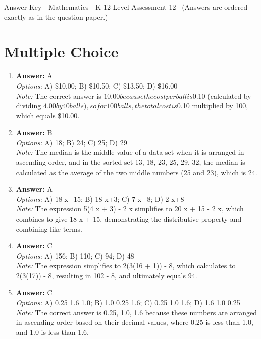 \documentclass[12pt]{article}
\begin{document}
\begin{center}
Answer Key - Mathematics - K-12 Level Assessment 12 \
\small (Answers are ordered exactly as in the question paper.)
\end{center}

\section*{Multiple Choice}
\begin{enumerate}[label=\arabic*.]
\item \textbf{Answer:} A
\\ \textit{Options:} A) \$10.00; B) \$10.50; C) \$13.50; D) \$16.00
\\ \textit{Note:} The correct answer is $10.00 because the cost per ball is $0.10 (calculated by dividing $4.00 by 40 balls), so for 100 balls, the total cost is $0.10 multiplied by 100, which equals \$10.00.
\item \textbf{Answer:} B
\\ \textit{Options:} A) 18; B) 24; C) 25; D) 29
\\ \textit{Note:} The median is the middle value of a data set when it is arranged in ascending order, and in the sorted set 13, 18, 23, 25, 29, 32, the median is calculated as the average of the two middle numbers (25 and 23), which is 24.
\item \textbf{Answer:} A
\\ \textit{Options:} A) 18 x+15; B) 18 x+3; C) 7 x+8; D) 2 x+8
\\ \textit{Note:} The expression 5(4 x + 3) - 2 x simplifies to 20 x + 15 - 2 x, which combines to give 18 x + 15, demonstrating the distributive property and combining like terms.
\item \textbf{Answer:} C
\\ \textit{Options:} A) 156; B) 110; C) 94; D) 48
\\ \textit{Note:} The expression simplifies to 2(3(16 + 1)) - 8, which calculates to 2(3(17)) - 8, resulting in 102 - 8, and ultimately equals 94.
\item \textbf{Answer:} C
\\ \textit{Options:} A) 0.25 1.6 1.0; B) 1.0 0.25 1.6; C) 0.25 1.0 1.6; D) 1.6 1.0 0.25
\\ \textit{Note:} The correct answer is 0.25, 1.0, 1.6 because these numbers are arranged in ascending order based on their decimal values, where 0.25 is less than 1.0, and 1.0 is less than 1.6.
\end{enumerate}
\end{document}
